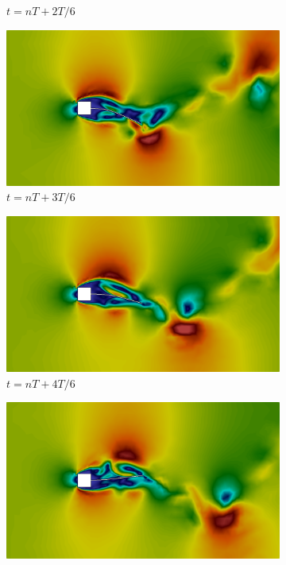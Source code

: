 \begin{figure}[h!]
\begin{subfigure}[b]{0.49\textwidth}
        \caption{$t=nT+2T/6$}
    \end{subfigure}
    \begin{subfigure}[b]{0.49\textwidth}
        \includegraphics[width=\linewidth]{Figuras/FSI-prism2/vT4.png}
        \caption{$t=nT+3T/6$}
    \end{subfigure}
    \begin{subfigure}[b]{0.49\textwidth}
        \includegraphics[width=\linewidth]{Figuras/FSI-prism2/vT5.png}
        \caption{$t=nT+4T/6$}
    \end{subfigure}
    \begin{subfigure}[b]{0.49\textwidth}
        \includegraphics[width=\linewidth]{Figuras/FSI-prism2/vT6.png}

\end{subfigure}
\end{figure}
